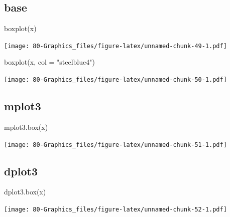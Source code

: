 \documentclass[
]{book}
\newenvironment{Shaded}{\begin{snugshade}}{\end{snugshade}}
\newcommand{\AttributeTok}[1]{\textcolor[rgb]{0.77,0.63,0.00}{#1}}
\newcommand{\FunctionTok}[1]{\textcolor[rgb]{0.00,0.00,0.00}{#1}}
\newcommand{\NormalTok}[1]{#1}
\newcommand{\StringTok}[1]{\textcolor[rgb]{0.31,0.60,0.02}{#1}}
\begin{document}
\hypertarget{base-6}{%
\subsection{base}\label{base-6}}

\begin{Shaded}
\begin{Highlighting}[]
\FunctionTok{boxplot}\NormalTok{(x)}
\end{Highlighting}
\end{Shaded}

\texttt{[image: 80-Graphics\_files/figure-latex/unnamed-chunk-49-1.pdf]}

\begin{Shaded}
\begin{Highlighting}[]
\FunctionTok{boxplot}\NormalTok{(x, }\AttributeTok{col =} \StringTok{"steelblue4"}\NormalTok{)}
\end{Highlighting}
\end{Shaded}

\texttt{[image: 80-Graphics\_files/figure-latex/unnamed-chunk-50-1.pdf]}

\hypertarget{mplot3-5}{%
\subsection{\texorpdfstring{\textbf{mplot3}}{mplot3}}\label{mplot3-5}}

\begin{Shaded}
\begin{Highlighting}[]
\FunctionTok{mplot3.box}\NormalTok{(x)}
\end{Highlighting}
\end{Shaded}

\texttt{[image: 80-Graphics\_files/figure-latex/unnamed-chunk-51-1.pdf]}

\hypertarget{dplot3-5}{%
\subsection{\texorpdfstring{\textbf{dplot3}}{dplot3}}\label{dplot3-5}}

\begin{Shaded}
\begin{Highlighting}[]
\FunctionTok{dplot3.box}\NormalTok{(x)}
\end{Highlighting}
\end{Shaded}

\texttt{[image: 80-Graphics\_files/figure-latex/unnamed-chunk-52-1.pdf]}
\end{document}
